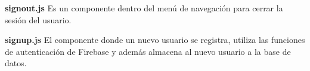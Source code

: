 \textbf{signout.js}
\label{\detokenize{code_docs:signout-js}}
Es un componente dentro del menú de navegación para cerrar la sesión del usuario.

%
\begin{sphinxVerbatim}[commandchars=\\\{\}]
    
\end{sphinxVerbatim}


\textbf{signup.js}
\label{\detokenize{code_docs:signup-js}}
El componente donde un nuevo usuario se registra, utiliza las funciones
de autenticación de Firebase y además almacena al nuevo usuario a la base de
datos.

